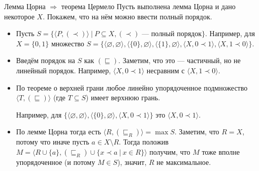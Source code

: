 \documentclass[aspectratio=169]{beamer}
\begin{document}
\begin{frame}{Лемма Цорна $\Rightarrow$ теорема Цермело}
Пусть выполнена лемма Цорна и дано некоторое $X$. Покажем, что на нём можно ввести полный порядок.
\begin{itemize}
\item Пусть $S = \{ \langle P, (\prec)\rangle \ |\ P \subseteq X, (\prec)\text{ --- полный порядок} \}$.
{\color{gray}Например, для $X = \{0,1\}$ множество
$S = \{
\langle\varnothing,\varnothing\rangle,
\langle \{0\},\varnothing\rangle,
\langle\{1\},\varnothing\rangle,
\langle X, 0 \prec 1\rangle,
\langle X, 1 \prec 0\rangle
\}$.}

\item Введём порядок на $S$ как $(\sqsubseteq)$. Заметим, что это --- частичный, но не линейный порядок. 
{\color{gray}Например, $\langle X, 0 \prec 1\rangle$ несравним с $\langle X, 1 \prec 0\rangle$.}

\item По теореме о верхней грани любое линейно упорядоченное подмножество 
$\langle T, (\sqsubseteq) \rangle$ (где $T \subseteq S$) имеет
верхнюю грань.

{\color{gray}Например, 
для $\{\langle\varnothing,\varnothing\rangle,
\langle \{0\},\varnothing\rangle,
\langle X, 0 \prec 1\rangle\}$ это $\langle X, 0 \prec 1\rangle$.}

\item По лемме Цорна тогда есть $\langle R, (\sqsubseteq_R)\rangle = \max S$. Заметим, что $R = X$, потому что иначе пусть
$a \in X\setminus R$. Тогда положив $M = \langle R\cup\{a\}, (\sqsubseteq_R)\cup\{x\prec a\ |\ x \in R\} \rangle$
получим, что $M$ тоже вполне упорядоченное (и потому $M \in S$), значит, $R$ не максимальное.
\end{itemize}
\end{frame}
\end{document}
